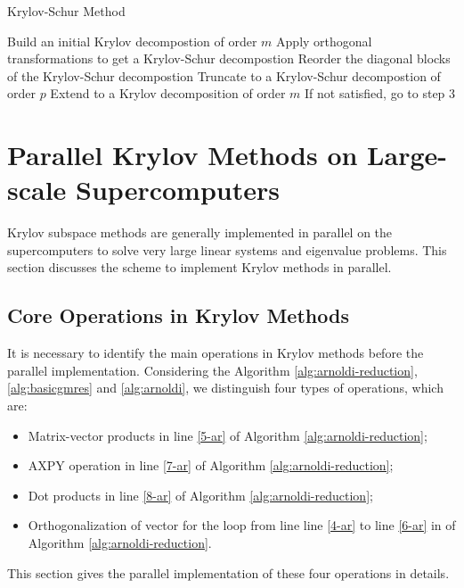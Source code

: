 {\begin{algorithm}[t]{}
	\caption{Krylov-Schur Method}   
	\label{alg:krylov-schur}   
	\begin{algorithmic}[1]
		\State Build an initial Krylov decompostion of order $m$
		\State Apply orthogonal transformations to get a Krylov-Schur decompostion
		\State Reorder the diagonal blocks of the Krylov-Schur decompostion
		\State Truncate to a Krylov-Schur decompostion of order $p$
		\State Extend to a Krylov decomposition of order $m$
		\State If not satisfied, go to step 3
		\EndFunction
	\end{algorithmic}  
\end{algorithm}


\section{Parallel Krylov Methods on Large-scale Supercomputers}

Krylov subspace methods are generally implemented in parallel on the supercomputers to solve very large linear systems and eigenvalue problems. This section discusses the scheme to implement Krylov methods in parallel.

\subsection{Core Operations in Krylov Methods}

It is necessary to identify the main operations in Krylov methods before the parallel implementation. Considering the Algorithm \ref{alg:arnoldi-reduction}, \ref{alg:basicgmres} and \ref{alg:arnoldi}, we distinguish four types of operations, which are:

\begin{itemize}
	\item Matrix-vector products in line \ref{5-ar} of Algorithm \ref{alg:arnoldi-reduction};
	\item AXPY operation in line \ref{7-ar} of Algorithm \ref{alg:arnoldi-reduction};
	\item Dot products in line \ref{8-ar} of Algorithm \ref{alg:arnoldi-reduction};
	\item Orthogonalization of vector for the loop from line line \ref{4-ar} to line \ref{6-ar} in of Algorithm \ref{alg:arnoldi-reduction}.
\end{itemize}

This section gives the parallel implementation of these four operations in details.

}
